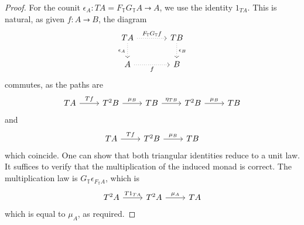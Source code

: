 \begin{proof}
    For the counit \( \epsilon_A : TA = F_{\mathbb T} G_{\mathbb T} A \rightdotarrow A \), we use the identity \( 1_{TA} \).
    This is natural, as given \( f : A \rightdotarrow B \), the diagram
\[\begin{tikzcd}[column sep=large]
	TA & TB \\
	A & B
	\arrow["{F_{\mathbb T} G_{\mathbb T}f}", dotted, from=1-1, to=1-2]
	\arrow["{\epsilon_B}", dotted, from=1-2, to=2-2]
	\arrow["{\epsilon_A}"', dotted, from=1-1, to=2-1]
	\arrow["f"', dotted, from=2-1, to=2-2]
\end{tikzcd}\]
    commutes, as the paths are%
    \[\begin{tikzcd}
        TA & {T^2B} & TB & {T^2B} & TB
        \arrow["Tf", from=1-1, to=1-2]
        \arrow["{\mu_B}", from=1-2, to=1-3]
        \arrow["{\eta_{TB}}", from=1-3, to=1-4]
        \arrow["{\mu_B}", from=1-4, to=1-5]
    \end{tikzcd}\]
    and
\[\begin{tikzcd}
	TA & {T^2B} & TB
	\arrow["Tf", from=1-1, to=1-2]
	\arrow["{\mu_B}", from=1-2, to=1-3]
\end{tikzcd}\]
    which coincide.
    One can show that both triangular identities reduce to a unit law.
    It suffices to verify that the multiplication of the induced monad is correct.
    The multiplication law is \( G_{\mathbb T} \epsilon_{F_{\mathbb T} A} \), which is
\[\begin{tikzcd}
	{T^2A} & {T^2A} & TA
	\arrow["{T1_{TA}}", from=1-1, to=1-2]
	\arrow["{\mu_A}", from=1-2, to=1-3]
\end{tikzcd}\]
    which is equal to \( \mu_A \), as required.
\end{proof}

